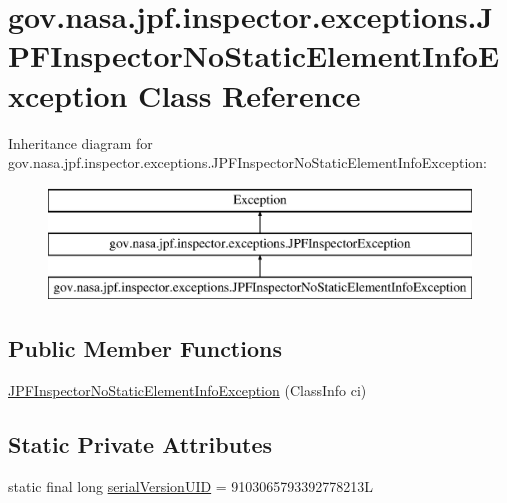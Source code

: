 \hypertarget{classgov_1_1nasa_1_1jpf_1_1inspector_1_1exceptions_1_1_j_p_f_inspector_no_static_element_info_exception}{}\section{gov.\+nasa.\+jpf.\+inspector.\+exceptions.\+J\+P\+F\+Inspector\+No\+Static\+Element\+Info\+Exception Class Reference}
\label{classgov_1_1nasa_1_1jpf_1_1inspector_1_1exceptions_1_1_j_p_f_inspector_no_static_element_info_exception}
Inheritance diagram for gov.\+nasa.\+jpf.\+inspector.\+exceptions.\+J\+P\+F\+Inspector\+No\+Static\+Element\+Info\+Exception\+:\begin{figure}[H]
\begin{center}
\leavevmode
\includegraphics[height=3.000000cm]{classgov_1_1nasa_1_1jpf_1_1inspector_1_1exceptions_1_1_j_p_f_inspector_no_static_element_info_exception}
\end{center}
\end{figure}
\subsection*{Public Member Functions}
\begin{DoxyCompactItemize}
\item 
\hyperlink{classgov_1_1nasa_1_1jpf_1_1inspector_1_1exceptions_1_1_j_p_f_inspector_no_static_element_info_exception_a0e233aacb6f32e7bcc72003753a31bc4}{J\+P\+F\+Inspector\+No\+Static\+Element\+Info\+Exception} (Class\+Info ci)
\end{DoxyCompactItemize}
\subsection*{Static Private Attributes}
\begin{DoxyCompactItemize}
\item 
static final long \hyperlink{classgov_1_1nasa_1_1jpf_1_1inspector_1_1exceptions_1_1_j_p_f_inspector_no_static_element_info_exception_ace5b2e6da3aa341a2a411b8b59500246}{serial\+Version\+U\+ID} = 9103065793392778213L
\end{DoxyCompactItemize}


